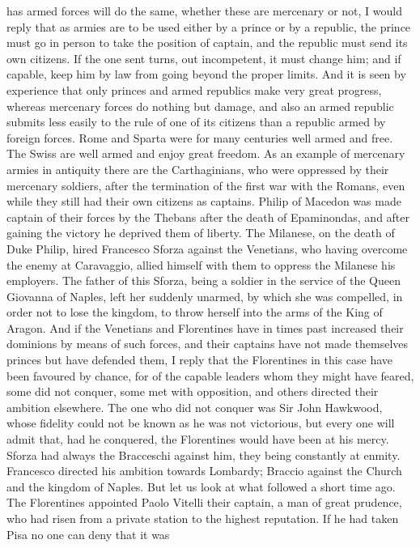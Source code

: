 \documentclass[12pt,letterpaper]{memoir}
\begin{document}
has armed forces will do the same, whether these are mercenary or not,
I would reply that as armies are to be used either by a prince or by a
republic, the prince must go in person to take the position of captain,
and the republic must send its own citizens. If the one sent turns,
out incompetent, it must change him; and if capable, keep him by law
from going beyond the proper limits. And it is seen by experience that
only princes and armed republics make very great progress, whereas
mercenary forces do nothing but damage, and also an armed republic
submits less easily to the rule of one of its citizens than a republic
armed by foreign forces. Rome and Sparta were for many centuries well
armed and free. The Swiss are well armed and enjoy great freedom. As an
example of mercenary armies in antiquity there are the Carthaginians,
who were oppressed by their mercenary soldiers, after the termination
of the first war with the Romans, even while they still had their own
citizens as captains. Philip of Macedon was made captain of their
forces by the Thebans after the death of Epaminondas, and after gaining
the victory he deprived them of liberty. The Milanese, on the death
of Duke Philip, hired Francesco Sforza against the Venetians, who
having overcome the enemy at Caravaggio, allied himself with them to
oppress the Milanese his employers. The father of this Sforza, being
a soldier in the service of the Queen Giovanna of Naples, left her
suddenly unarmed, by which she was compelled, in order not to lose the
kingdom, to throw herself into the arms of the King of Aragon. And
if the Venetians and Florentines have in times past increased their
dominions by means of such forces, and their captains have not made
themselves princes but have defended them, I reply that the Florentines
in this case have been favoured by chance, for of the capable leaders
whom they might have feared, some did not conquer, some met with
opposition, and others directed their ambition elsewhere. The one who
did not conquer was Sir John Hawkwood, whose fidelity could not be
known as he was not victorious, but every one will admit that, had he
conquered, the Florentines would have been at his mercy. Sforza had
always the Bracceschi against him, they being constantly at enmity.
Francesco directed his ambition towards Lombardy; Braccio against the
Church and the kingdom of Naples. But let us look at what followed a
short time ago. The Florentines appointed Paolo Vitelli their captain,
a man of great prudence, who had risen from a private station to the
highest reputation. If he had taken Pisa no one can deny that it was
\end{document}
